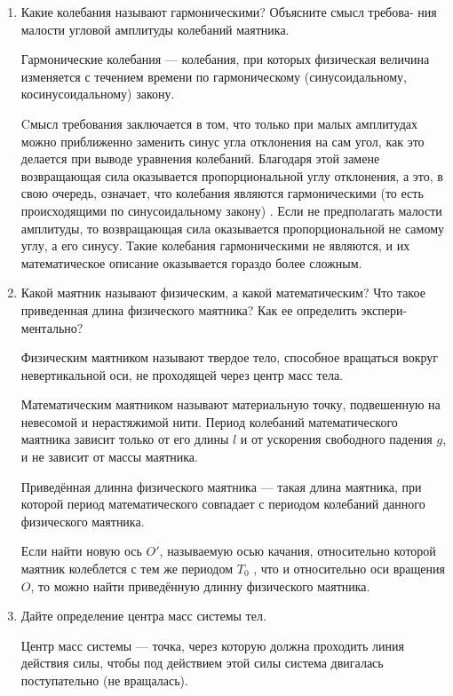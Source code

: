 \documentclass[12pt,a4paper]{article}%
\begin{document}
\begin{enumerate}
	\item Какие колебания называют гармоническими? Объясните смысл требова-
	ния малости угловой амплитуды колебаний маятника.
	
	Гармонические колебания — колебания, при которых физическая величина изменяется с течением времени по гармоническому (синусоидальному, косинусоидальному) закону. 
	
	Cмысл требования заключается в том, что только при малых амплитудах можно приближенно заменить синус угла отклонения на сам угол, как это делается при выводе уравнения колебаний. Благодаря этой замене возвращающая сила оказывается пропорциональной углу отклонения, а это, в свою очередь, означает, что колебания являются гармоническими (то есть происходящими по синусоидальному закону) . Если не предполагать малости амплитуды, то возвращающая сила оказывается пропорциональной не самому углу, а его синусу. Такие колебания гармоническими не являются, и их математическое описание оказывается гораздо более сложным.
	
	\item Какой маятник называют физическим, а какой математическим? Что такое
	приведенная длина физического маятника? Как ее определить экспери-
	ментально?
	
	Физическим маятником называют твердое тело, способное вращаться вокруг невертикальной оси, не проходящей через центр масс
	тела.
	
	Математическим маятником называют материальную точку, подвешенную на
	невесомой и нерастяжимой нити. Период колебаний математического маятника зависит
	только от его длины $l$ и от ускорения свободного падения $g$, и не зависит от массы
	маятника.
	
	Приведённая длинна физического маятника --- такая длина маятника, при которой период математического совпадает с периодом колебаний данного
	физического маятника. 
	
	Если найти новую ось $O'$, называемую осью качания, относительно которой маятник колеблется с тем же периодом $T_0$ , что и относительно оси вращения $O$, то можно найти приведённую длинну физического маятника.
	
	
	
	\item Дайте определение центра масс системы тел.
	
	Центр масс системы --- точка, через которую должна проходить линия действия силы, чтобы под действием этой силы система двигалась поступательно (не вращалась).
	

\end{enumerate}
\end{document}
